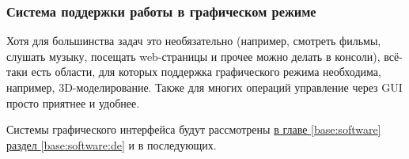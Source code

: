 \subsubsection{Система поддержки работы в графическом режиме}\label{base:os:structure:additional:gui}
Хотя для большинства задач это необязательно (например, смотреть фильмы, слушать музыку, посещать web-страницы и прочее можно делать в консоли), всё-таки есть области, для которых поддержка графического режима необходима, например, 3D-моделирование. Также для многих операций управление через GUI просто приятнее и удобнее.

Системы графического интерфейса будут рассмотрены \hyperref[base:software:de]{в главе \ref*{base:software} раздел \ref*{base:software:de}} и в последующих.